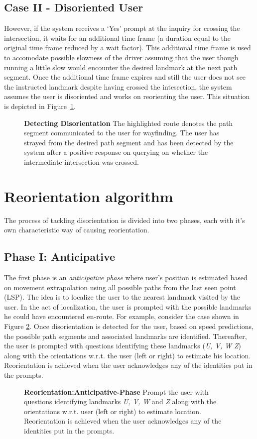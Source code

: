 \documentclass{iitkthesis}
\begin{document}
\subsection*{Case II - Disoriented User}
However, if the system receives a `Yes' prompt at the inquiry for 
crossing the intersection, it waits for an additional time frame (a duration
equal to the original time frame reduced by a wait factor). This 
additional time frame is used to accomodate possible slowness of the 
driver assuming that the user though running a little slow would 
encounter the desired landmark at the next path segment. Once the 
additional time frame expires and still the user does not see the instructed 
landmark despite having crossed the intesection, the system assumes the
user is disoriented and works on reorienting the user.
This situation is depicted in Figure~\ref{fig:detect}. 
\begin{figure}
\centering
{}
\caption{\textbf{Detecting Disorientation} The highlighted route denotes 
the path segment communicated to the user for wayfinding. The user has 
strayed from the desired path segment and has been detected by the 
system after a positive response on querying on whether the intermediate 
intersection was crossed.}
\label{fig:detect}
 \end{figure}
\section{Reorientation algorithm}
\label{sec:reorient}
The process of tackling disorientation is divided into two phases, each 
with it's own characteristic way of causing reorientation. 
\subsection*{Phase I: Anticipative}
The first phase is an \textit{anticipative phase} where user's position is estimated based on movement extrapolation using all possible paths from 
the last seen point (LSP). The idea is to localize the user to the 
nearest landmark visited by the user. In the act of localization, the 
user is prompted with the possible landmarks he could have encountered 
en-route. For example, consider the case shown in Figure 
\ref{fig:anticipative}. Once disorientation is detected for the user, 
based on speed predictions, the possible path 
segments and associated landmarks are identified. Thereafter,  
the user is prompted with questions identifying these landmarks (\textit{U, V, W} 
\textit{Z}) along with the orientations w.r.t. the user (left or right) to 
estimate his location. Reorientation is achieved when the user 
acknowledges any of the identities put in the prompts.
\begin{figure}
\centering
{}
\caption{\textbf{Reorientation:Anticipative-Phase} Prompt the user with 
questions identifying landmarks \textit{U, V, W} and \textit{Z} along 
with the orientations w.r.t. user (left or right) to estimate location. 
Reorientation is achieved when the user acknowledges any of the 
identities put in the prompts.}
\label{fig:anticipative}
 \end{figure}
\end{document}
